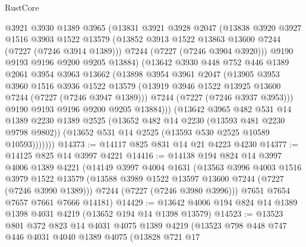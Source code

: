 \begin{lexlean}{RustCore}
\begin{coremodule}
              @3921
              @3930
              @1389
              @3965
              (@13831
                @3921
                @3928
                @2047
                (@13838
                  @3920
                  @3927
                  @1516
                  @3903
                  @1522
                  @13579
                  (@13852 @3913 @1522 @13863 @13600 @7244 (@7227 (@7246 @3914 @1389)))
                  @7244
                  (@7227 (@7246 @3904 @3920)))
                @9190
                @9193
                @9196
                @9200
                @9205
                @13884)
              (@13642
                @3930
                @448
                @752
                @446
                @1389
                @2061
                @3954
                @3963
                @13662
                (@13898
                  @3954
                  @3961
                  @2047
                  (@13905
                    @3953
                    @3960
                    @1516
                    @3936
                    @1522
                    @13579
                    (@13919 @3946 @1522 @13925 @13600 @7244 (@7227 (@7246 @3947 @1389)))
                    @7244
                    (@7227 (@7246 @3937 @3953)))
                  @9190
                  @9193
                  @9196
                  @9200
                  @9205
                  @13884)))
            (@13642
              @3965
              @482
              @531
              @14
              @1389
              @2230
              @1389
              @2525
              (@13652 @482 @14 @2230 (@13593 @481 @2230 @9798 @9802))
              (@13652 @531 @14 @2525 (@13593 @530 @2525 @10589 @10593)))))))
@14373 := @14117 @825 @831 @14 @21 @4223 @4230
@14377 := @14125 @825 @14 @3997 @4221
@14416 := @14138
    @194
    @824
    @14
    @3997
    @4006
    @1389
    @4221
    (@14149
      @3997
      @4004
      @1631
      (@13563
        @3996
        @4003
        @1516
        @3979
        @1522
        @13579
        (@13588 @3989 @1522 @13597 @13600 @7244 (@7227 (@7246 @3990 @1389)))
        @7244
        (@7227 (@7246 @3980 @3996)))
      @7651
      @7654
      @7657
      @7661
      @7666
      @14181)
@14429 := @13642 @4006 @194 @824 @14 @1389 @1398 @4031 @4219 (@13652 @194 @14 @1398 @13579)
@14523 := @13523
    @801
    @372
    @823
    @14
    @4031
    @4075
    @1389
    @4219
    (@13523
      @798
      @448
      @747
      @446
      @4031
      @4040
      @1389
      @4075
      (@13828
        @721
        @17

\end{coremodule}
\end{lexlean}
